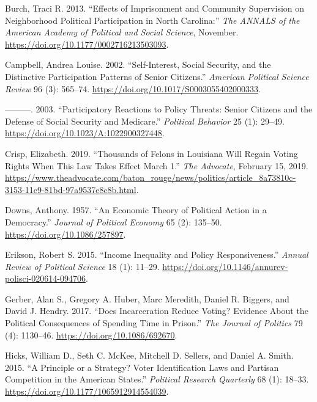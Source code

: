 \documentclass[
  12pt,
]{article}
\newlength{\cslhangindent}
\newenvironment{cslreferences}%
  {\setlength{\parindent}{0pt}%
  \everypar{\setlength{\hangindent}{\cslhangindent}}\ignorespaces}%
  {\par}
\begin{document}
\begin{cslreferences}
\leavevmode\hypertarget{ref-Burch2013}{}%
Burch, Traci R. 2013. ``Effects of Imprisonment and Community Supervision on Neighborhood Political Participation in North Carolina:'' \emph{The ANNALS of the American Academy of Political and Social Science}, November. \url{https://doi.org/10.1177/0002716213503093}.

\leavevmode\hypertarget{ref-Campbell2002}{}%
Campbell, Andrea Louise. 2002. ``Self-Interest, Social Security, and the Distinctive Participation Patterns of Senior Citizens.'' \emph{American Political Science Review} 96 (3): 565--74. \url{https://doi.org/10.1017/S0003055402000333}.

\leavevmode\hypertarget{ref-Campbell2003}{}%
---------. 2003. ``Participatory Reactions to Policy Threats: Senior Citizens and the Defense of Social Security and Medicare.'' \emph{Political Behavior} 25 (1): 29--49. \url{https://doi.org/10.1023/A:1022900327448}.

\leavevmode\hypertarget{ref-Crisp2019}{}%
Crisp, Elizabeth. 2019. ``Thousands of Felons in Louisiana Will Regain Voting Rights When This Law Takes Effect March 1.'' \emph{The Advocate}, February 15, 2019. \url{https://www.theadvocate.com/baton_rouge/news/politics/article_8a73810c-3153-11e9-81bd-97a9537e8c8b.html}.

\leavevmode\hypertarget{ref-Downs1957}{}%
Downs, Anthony. 1957. ``An Economic Theory of Political Action in a Democracy.'' \emph{Journal of Political Economy} 65 (2): 135--50. \url{https://doi.org/10.1086/257897}.

\leavevmode\hypertarget{ref-Erikson2015}{}%
Erikson, Robert S. 2015. ``Income Inequality and Policy Responsiveness.'' \emph{Annual Review of Political Science} 18 (1): 11--29. \url{https://doi.org/10.1146/annurev-polisci-020614-094706}.

\leavevmode\hypertarget{ref-Gerber2017}{}%
Gerber, Alan S., Gregory A. Huber, Marc Meredith, Daniel R. Biggers, and David J. Hendry. 2017. ``Does Incarceration Reduce Voting? Evidence About the Political Consequences of Spending Time in Prison.'' \emph{The Journal of Politics} 79 (4): 1130--46. \url{https://doi.org/10.1086/692670}.

\leavevmode\hypertarget{ref-Hicks2015}{}%
Hicks, William D., Seth C. McKee, Mitchell D. Sellers, and Daniel A. Smith. 2015. ``A Principle or a Strategy? Voter Identification Laws and Partisan Competition in the American States.'' \emph{Political Research Quarterly} 68 (1): 18--33. \url{https://doi.org/10.1177/1065912914554039}.


\end{cslreferences}
\end{document}
